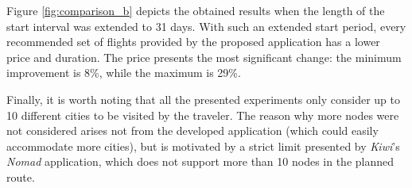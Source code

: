Figure \ref{fig:comparison_b} depicts the obtained results when the length of the start interval was extended to 31 days. With such an extended start period, every recommended set of flights provided by the proposed application has a lower price and duration. The price presents the most significant change: the minimum improvement is 8\%, while the maximum is 29\%.

Finally, it is worth noting that all the presented experiments only consider up to 10 different cities to be visited by the traveler. The reason why more nodes were not considered arises not from the developed application (which could easily accommodate more cities), but is motivated by a strict limit presented by \textit{Kiwi}'s \textit{Nomad} application, which does not support more than 10 nodes in the planned route.
  




